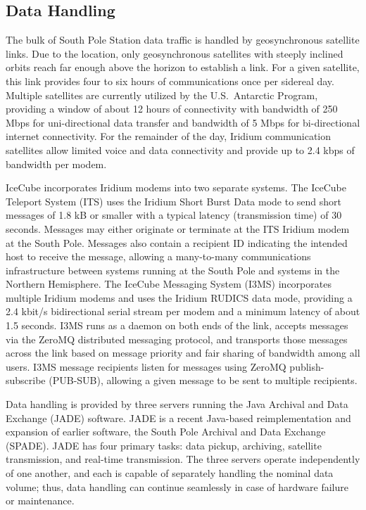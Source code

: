 \subsection{\label{sect:online_jade}Data Handling}

The bulk of South Pole Station data traffic is handled by geosynchronous
satellite links.  Due to the location, only
geosynchronous satellites with steeply inclined orbits reach far enough
above the horizon to establish a link.  For a given satellite, this link
provides four to six hours of communications once per sidereal day.
Multiple satellites are currently utilized by the
U.S.~Antarctic Program, providing a window of about 12 hours of connectivity with
bandwidth of 250 Mbps for uni-directional data transfer and bandwidth
of 5 Mbps for bi-directional internet connectivity.  For the remainder of the day, Iridium
communication satellites allow limited voice and data connectivity and provide up to 2.4
kbps of bandwidth per modem.

IceCube incorporates Iridium modems into two separate systems.  The IceCube
Teleport System (ITS) uses the Iridium Short Burst Data mode to send short
messages of 1.8 kB or smaller with a typical latency (transmission time) of 30 seconds.
Messages may either originate or terminate at the ITS Iridium modem at the
South Pole.  Messages also contain a recipient ID indicating the intended
host to receive the message, allowing a many-to-many communications
infrastructure between systems running at the South Pole and systems in the
Northern Hemisphere.  The IceCube Messaging System (I3MS) incorporates
multiple Iridium modems and uses the Iridium RUDICS data mode, providing a
2.4 kbit/s bidirectional serial stream per modem and a minimum latency of
about 1.5 seconds.  I3MS runs as a daemon on both ends of the link, accepts
messages via the ZeroMQ distributed messaging protocol, and transports
those messages across the link based on message priority and fair sharing
of bandwidth among all users. I3MS message recipients listen for messages
using ZeroMQ publish-subscribe (PUB-SUB), allowing a given message to be
sent to multiple recipients.

Data handling is provided by three servers running the Java Archival and
Data Exchange (JADE) software. JADE is a
recent Java-based reimplementation and expansion of earlier software, the
South Pole Archival and Data Exchange (SPADE).  JADE has 
four primary tasks: data pickup, archiving, satellite transmission, and
real-time transmission. The three servers operate independently of one
another, and each is capable of separately handling the nominal
data volume; thus, data handling can continue seamlessly in case of
hardware failure or maintenance. 

